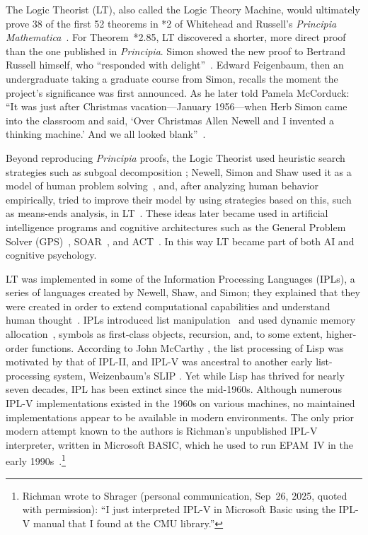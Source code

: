 \documentclass[journal]{IEEEtran}
\begin{document}
The Logic Theorist (LT), also called the Logic Theory Machine, would 
ultimately prove 38 of the first 52 theorems in *2 of Whitehead 
and Russell's \textit{Principia Mathematica}~\cite{LT1957,whitehead1910principia}.  
For Theorem~*2.85, LT discovered a shorter, more direct proof
than the one published in \textit{Principia}. Simon showed the new
proof to Bertrand Russell himself, who ``responded with
delight''~\cite[p.~167]{mccorduck2004machines}. Edward Feigenbaum,
then an undergraduate taking a graduate course from Simon, recalls the
moment the project's significance was first announced. As he later
told Pamela McCorduck: ``It was just after Christmas vacation---January
1956---when Herb Simon came into the classroom and said, `Over
Christmas Allen Newell and I invented a thinking machine.' And we all
looked blank''~\cite[p.~138]{mccorduck2004machines}.

Beyond reproducing \textit{Principia} proofs, the Logic Theorist
used heuristic search strategies such as subgoal decomposition
\cite{LT1957}; Newell, Simon and Shaw used it as a model of
human problem solving~\cite{HPS1958}, and, after analyzing human
behavior empirically, tried to improve their model by using strategies
based on this, such as means-ends analysis, in LT~\cite{PCT1959}.
These ideas later became used in artificial intelligence programs and
cognitive architectures such as the General Problem Solver
(GPS)~\cite{newell1959gps}, SOAR~\cite{laird1991},
and ACT~\cite{anderson1993,anderson1996}.
In this way LT became part of both AI and cognitive psychology.

LT was implemented in some of the Information Processing Languages (IPLs),
a series of languages created by Newell, Shaw, and Simon;
they explained that they were created in order to extend computational
capabilities and understand human thought~\cite[p.~II-17]{cip16june1958}.
IPLs introduced list manipulation~\cite[section~2.6]{knuth1997}
and used dynamic memory allocation~\cite{cmuarchiveshawinterview},
symbols as first-class objects, recursion, and,
to some extent, higher-order functions.
According to John McCarthy \cite{HOPLLISP,mccarthy1960lisp}, the 
list processing of Lisp was
motivated by that of IPL-II, and IPL-V was ancestral
to another early list-processing system,
Weizenbaum's SLIP \cite{SLIP1963}.  Yet while Lisp has thrived for
nearly seven decades, IPL has been extinct since the mid-1960s.
Although numerous IPL-V implementations existed in the 1960s on
various machines, no maintained implementations appear to be available
in modern environments. The only prior modern attempt known to the
authors is Richman's unpublished IPL-V interpreter, written in
Microsoft BASIC, which he used to run EPAM~IV in the early
1990s~\cite{richman1995epam}.\footnote{Richman wrote to Shrager
(personal communication, Sep~26, 2025, quoted with
permission): ``I just interpreted IPL-V in Microsoft Basic using the
IPL-V manual that I found at the CMU library.''}
\end{document}
